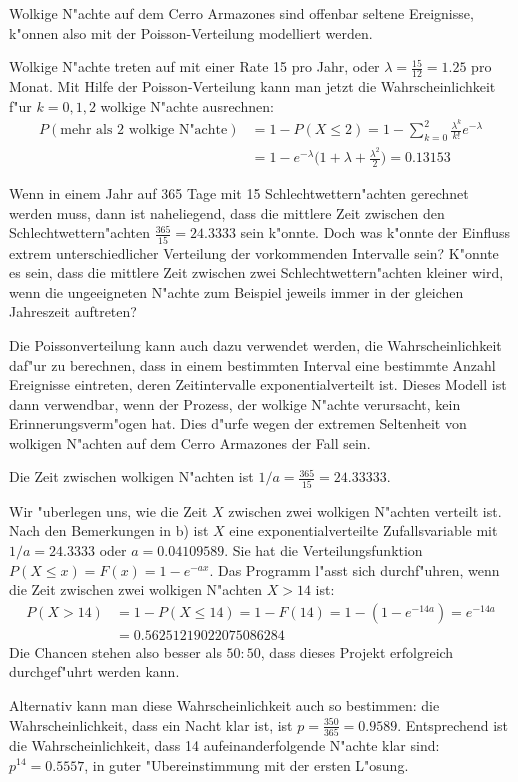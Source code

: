 \begin{loesung}
Wolkige N"achte auf dem Cerro Armazones sind offenbar seltene
Ereignisse, k"onnen also mit der Poisson-Verteilung modelliert
werden.
\begin{teilaufgaben}
\item Wolkige N"achte treten auf mit einer Rate 15 pro Jahr, oder
$\lambda=\frac{15}{12}=1.25$ pro Monat. Mit Hilfe der Poisson-Verteilung
kann man jetzt die Wahrscheinlichkeit f"ur $k=0,1,2$ wolkige N"achte
ausrechnen:
\begin{align*}
P(\text{mehr als 2 wolkige N"achte})
&=1-P(X\le 2)
=
1-\sum_{k=0}^2\frac{\lambda^k}{k!}e^{-\lambda}
\\
&=1-e^{-\lambda}\biggl(1+\lambda+\frac{\lambda^2}2\biggr)
=0.13153
\end{align*}
\item 
Wenn in einem Jahr auf 365 Tage mit 15 Schlechtwettern"achten gerechnet
werden muss, dann ist naheliegend, dass die  mittlere Zeit zwischen
den Schlechtwettern"achten $\frac{365}{15}=24.3333$ sein k"onnte.
Doch was k"onnte der Einfluss extrem unterschiedlicher Verteilung
der vorkommenden Intervalle sein? K"onnte es sein, dass die mittlere
Zeit zwischen zwei Schlechtwettern"achten kleiner wird, wenn die
ungeeigneten N"achte zum Beispiel jeweils immer in der gleichen Jahreszeit
auftreten?

Die Poissonverteilung kann auch dazu verwendet werden, die Wahrscheinlichkeit
daf"ur zu berechnen, dass in einem bestimmten Interval eine bestimmte
Anzahl Ereignisse eintreten, deren Zeitintervalle exponentialverteilt ist.
Dieses Modell ist dann verwendbar, wenn der Prozess, der wolkige N"achte
verursacht, kein Erinnerungsverm"ogen hat. Dies d"urfe wegen der extremen
Seltenheit von wolkigen N"achten auf dem Cerro Armazones der Fall sein.

Die Zeit zwischen wolkigen N"achten ist $1/a=\frac{365}{15}=24.33333$.
\item
Wir "uberlegen uns, wie
die Zeit $X$ zwischen zwei wolkigen N"achten verteilt ist. Nach den Bemerkungen
in b) ist $X$ eine exponentialverteilte Zufallsvariable mit $1/a=24.3333$
oder $a=0.04109589$.
Sie hat die Verteilungsfunktion
$
P(X\le x)=
F(x)=1-e^{-ax}.
$
Das Programm l"asst sich durchf"uhren, wenn die Zeit zwischen zwei
wolkigen N"achten $X> 14$ ist:
\begin{align*}
P(X> 14)&=1-P(X\le 14)=1-F(14)=1-(1-e^{-14a})=e^{-14a}
\\
&= 0.56251219022075086284
\end{align*}
Die Chancen stehen also besser als $50:50$, dass dieses Projekt
erfolgreich durchgef"uhrt werden kann.

Alternativ kann man diese Wahrscheinlichkeit auch so bestimmen:
die Wahrscheinlichkeit, dass ein Nacht klar ist, ist $p=\frac{350}{365}=0.9589$.
Entsprechend ist die Wahrscheinlichkeit, dass 14 aufeinanderfolgende
N"achte klar sind: $p^{14}=0.5557$, in guter "Ubereinstimmung mit der
ersten L"osung.
\qedhere
\end{teilaufgaben}
\end{loesung}


